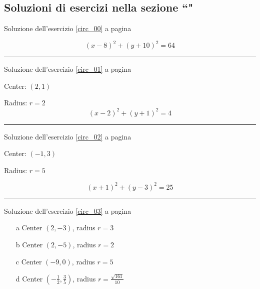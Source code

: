 
\subsection{Soluzioni di esercizi nella sezione ``\textbf{}"}


Soluzione dell'esercizio \ref{circ_00} a pagina \pageref{circ_00}\label{circs_00}

\begin{equation*}
(x-8)^2+(y+10)^2=64
\end{equation*}

\vspace{1cm}
\hrule
\vspace{1cm}


Soluzione dell'esercizio \ref{circ_01} a pagina \pageref{circ_01}\label{circs_01}

Center: $(2,1)$

Radius: $r=2$
\begin{equation*}
(x-2)^2+(y+1)^2=4
\end{equation*}

\vspace{1cm}
\hrule
\vspace{1cm}


Soluzione dell'esercizio \ref{circ_02} a pagina \pageref{circ_02}\label{circs_02}

Center: $(-1,3)$

Radius:  $r=5$

\begin{equation*}
(x+1)^2+(y-3)^2=25  
\end{equation*}

\vspace{1cm}
\hrule
\vspace{1cm}


Soluzione dell'esercizio \ref{circ_03} a pagina \pageref{circ_03}\label{circs_03}

\begin{itemize}
\item[a] Center $(2,-3)$, radius  $r=3$
\item[b] Center $(2,-5)$, radius  $r=2$
\item[c] Center $(-9,0)$, radius  $r=5$
\item[d] Center $(-\frac{1}{2},\frac{3}{5})$, radius  $r=\frac{\sqrt{161}}{10}$
\end{itemize}



